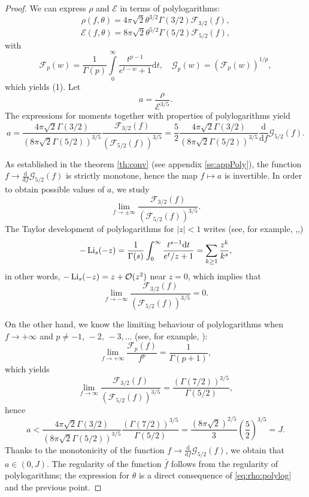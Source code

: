\begin{proof}
We can express $\rho$ and $\mathcal E$ in terms of polylogarithms:
\begin{equation}\label{eq:rho:polylog}
	\rho(f,\theta) = 4\pi\sqrt 2\theta^{3/2}\Gamma(3/2)\mathcal F_{3/2}(f),
\end{equation}
\begin{equation}\label{eq:E:polylog}\mathcal E(f,\theta)= 8\pi\sqrt 2\theta^{5/2}\Gamma(5/2)\mathcal F_{5/2}(f),
\end{equation}
with
\begin{equation*} \mathcal F_p(w)= \frac{1}{\Gamma(p)}\int\limits_0^{\infty}\frac{t^{p-1}}{e^{t-w}+1}
\mathrm dt,\quad \mathcal G_p(w)=(\mathcal F_p(w))^{1/p},\end{equation*}
which yields (1).
Let \[a = \frac{\rho}{\mathcal E^{3/5}}.\] 
The expressions for moments together with properties of polylogarithms yield
\[a=\frac{4\pi\sqrt 2 \Gamma(3/2)}{(8\pi\sqrt 2 \Gamma(5/2))^{3/5}}\frac{\mathcal F_{3/2}(f)}{(\mathcal F_{5/2}(f))^{3/5}}=\frac{5}{2} \frac{4\pi\sqrt 2 \Gamma(3/2)}{(8\pi\sqrt 2 \Gamma(5/2))^{3/5}}
\frac{\mathrm d}{\mathrm df   }\mathcal G_{5/2}(f).\]

As established in the theorem \ref{th:conv} (see appendix \ref{se:appPoly}), the function $f\to \frac{\mathrm d}{\mathrm df   }\mathcal G_{5/2}(f)$ is strictly monotone, hence the map $f\mapsto a$ is invertible. In order to obtain possible values of $a$, we study \[\lim_{f\to\pm\infty }\frac{\mathcal F_{3/2}(f)}{(\mathcal F_{5/2}(f))^{3/5}}.\]
The Taylor development of polylogarithms for $|z|<1$ writes (see, for example, \cite{NIST:DLMF},\cite{Olver:2010:NHMF},\cite{Prudnikov1986Integrals})
\[-\operatorname{Li}_s(-z)=\frac{1}{\Gamma(s)}\int^\infty_0\frac{t^{s-1}\mathrm dt}{e^t/z+1}=\sum_{k\ge 1}\frac{z^k}{k^s},\]in other words, $-\operatorname{Li}_s(-z)=z+\mathcal O(z^2)$ near $z=0$, which implies that
\[\lim_{f\to-\infty }\frac{\mathcal F_{3/2}(f)}{(\mathcal F_{5/2}(f))^{3/5}}=0.\]

On the other hand, we know the limiting behaviour of polylogarithms when $f\to+\infty$ and $p\ne -1,\,-2,\,-3,\dots$ (see, for example, \cite{Wood1992Computation}):
\[\lim_{f\to+\infty}\frac{\mathcal F_p(f)}{f^p}=\frac{1}{\Gamma(p+1)},\]
which yields
\[\lim_{f\to\infty }\frac{\mathcal F_{3/2}(f)}{(\mathcal F_{5/2}(f))^{3/5}}=\frac{(\Gamma(7/2))^{3/5}}{\Gamma(5/2)},\]
hence
\[a< \frac{4\pi\sqrt 2 \Gamma(3/2)}{(8\pi\sqrt 2 \Gamma(5/2))^{3/5}}\frac{(\Gamma(7/2))^{3/5}}{\Gamma(5/2)}=\frac{(8\pi\sqrt 2)^{2/5}}{3}\left(\frac 52 \right)^{3/5}  =J.\]
Thanks to the monotonicity of the function $f\to \frac{\mathrm d}{\mathrm df   }\mathcal G_{5/2}(f)$, we obtain that $a\in (0,J)$. The regularity of the function $\bar f$ follows from the regularity of polylogarithms; the expression for $\theta$ is a direct consequence of \eqref{eq:rho:polylog} and the previous point.


\end{proof}
